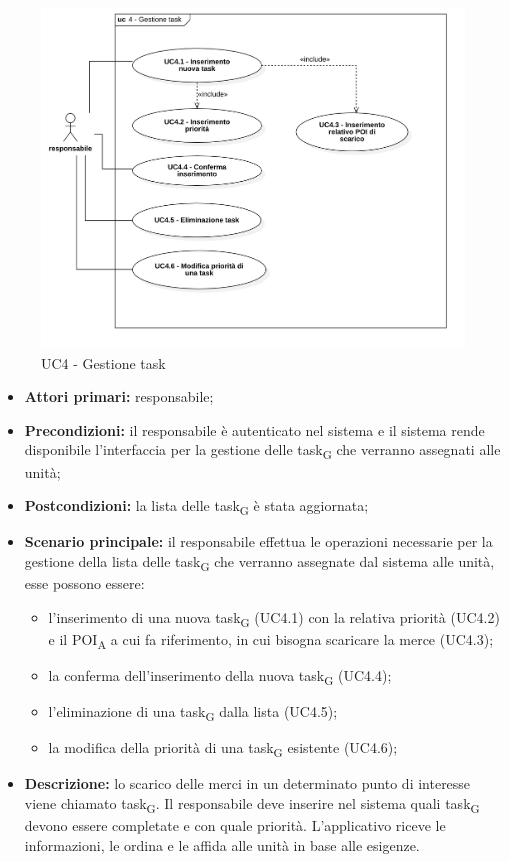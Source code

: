 \begin{figure}[H]
	\centering
	\includegraphics[scale=0.52]{res/images/uc4.png}
	\caption{UC4 - Gestione task}
\end{figure}

\begin{itemize}
	\item 	\textbf{Attori primari:} responsabile;
	\item 	\textbf{Precondizioni:} il responsabile è autenticato nel sistema e il sistema rende disponibile l'interfaccia per la gestione delle \gls{task}\textsubscript{G} che verranno assegnati alle unità;
	\item 	\textbf{Postcondizioni:} la lista delle \gls{task}\textsubscript{G} è stata aggiornata;
	\item 	\textbf{Scenario principale:} il responsabile effettua le operazioni necessarie per la gestione della lista delle \gls{task}\textsubscript{G} che verranno assegnate dal sistema alle unità, esse possono essere:
	\begin{itemize}
		\item l'inserimento di una nuova \gls{task}\textsubscript{G} (UC4.1) con la relativa priorità (UC4.2) e il \acrshort{POI}\textsubscript{A} a cui fa riferimento, in cui bisogna scaricare la merce (UC4.3);
		\item la conferma dell'inserimento della nuova \gls{task}\textsubscript{G} (UC4.4);
		\item l'eliminazione di una \gls{task}\textsubscript{G} dalla lista (UC4.5);
		\item la modifica della priorità di una \gls{task}\textsubscript{G} esistente (UC4.6);
	\end{itemize}
	\item 	\textbf{Descrizione:} lo scarico delle merci in un determinato punto di interesse viene chiamato \gls{task}\textsubscript{G}. Il responsabile deve inserire nel sistema quali \gls{task}\textsubscript{G} devono essere completate e con quale priorità. L'applicativo riceve le informazioni, le ordina e le affida alle unità in base alle esigenze. 

\end{itemize}


